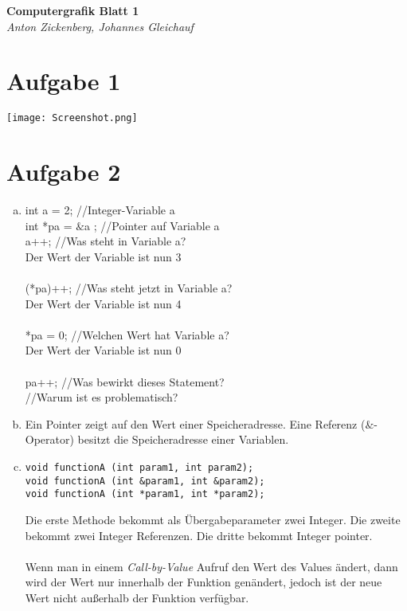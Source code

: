\documentclass[12pt]{article}
\begin{document}
\begin{center}
 \textbf{\Large Computergrafik Blatt 1}\\
 \emph{Anton Zickenberg, Johannes Gleichauf}
\end{center}

\section*{Aufgabe 1}
\texttt{[image: Screenshot.png]}
\section*{Aufgabe 2}
\begin{enumerate}[a)]
\item int a = 2; //Integer-Variable a\\ 
	  int *pa = $\&$a ; //Pointer auf Variable a\\ 
	  a++; //Was steht in Variable a?\\ 
	  Der Wert der Variable ist nun 3\\
	  \\	  
	  (*pa)++; //Was steht jetzt in Variable a?\\ 
	  Der Wert der Variable ist nun 4\\
	  \\
	  *pa = 0; //Welchen Wert hat Variable a?\\
	  Der Wert der Variable ist nun 0\\
	  \\ 
	  pa++; //Was bewirkt dieses Statement?\\ 
	  		//Warum ist es problematisch?\\
\item Ein Pointer zeigt auf den Wert einer Speicheradresse. Eine Referenz ($\&$-Operator) besitzt die Speicheradresse einer Variablen.
\item \begin{lstlisting}
void functionA (int param1, int param2);
void functionA (int &param1, int &param2);
void functionA (int *param1, int *param2);
\end{lstlisting}  
Die erste Methode bekommt als Übergabeparameter zwei Integer. Die zweite bekommt zwei Integer Referenzen. Die dritte bekommt Integer pointer.\\
\\
Wenn man in einem \emph{Call-by-Value} Aufruf den Wert des Values \"andert, dann wird der Wert nur innerhalb der Funktion gen\"andert, jedoch ist der neue Wert nicht au{\ss}erhalb der Funktion verf\"ugbar.\\

\end{enumerate}
\end{document}
